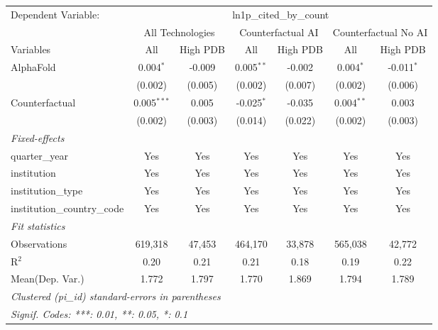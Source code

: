 \begingroup
\centering
\begin{tabular}{lcccccc}
   \tabularnewline \midrule \midrule
   Dependent Variable: & \multicolumn{6}{c}{ln1p\_cited\_by\_count}\\
 & \multicolumn{2}{c}{All Technologies} & \multicolumn{2}{c}{Counterfactual AI} & \multicolumn{2}{c}{Counterfactual No AI} \\
\cmidrule(lr){1-1}\cmidrule(lr){2-3} \cmidrule(lr){4-5} \cmidrule(lr){6-7}
Variables & \multicolumn{1}{c}{All} & \multicolumn{1}{c}{High PDB} & \multicolumn{1}{c}{All} & \multicolumn{1}{c}{High PDB} & \multicolumn{1}{c}{All} & \multicolumn{1}{c}{High PDB} \\
\cmidrule(lr){1-1}\cmidrule(lr){2-2} \cmidrule(lr){3-3} \cmidrule(lr){4-4} \cmidrule(lr){5-5} \cmidrule(lr){6-6} \cmidrule(lr){7-7}
   AlphaFold                    & 0.004$^{*}$   & -0.009  & 0.005$^{**}$ & -0.002  & 0.004$^{*}$  & -0.011$^{*}$\\   
                                & (0.002)       & (0.005) & (0.002)      & (0.007) & (0.002)      & (0.006)\\   
   Counterfactual               & 0.005$^{***}$ & 0.005   & -0.025$^{*}$ & -0.035  & 0.004$^{**}$ & 0.003\\   
                                & (0.002)       & (0.003) & (0.014)      & (0.022) & (0.002)      & (0.003)\\   
   \midrule
   \emph{Fixed-effects}\\
   quarter\_year                & Yes           & Yes     & Yes          & Yes     & Yes          & Yes\\  
   institution                  & Yes           & Yes     & Yes          & Yes     & Yes          & Yes\\  
   institution\_type            & Yes           & Yes     & Yes          & Yes     & Yes          & Yes\\  
   institution\_country\_code   & Yes           & Yes     & Yes          & Yes     & Yes          & Yes\\  
   \midrule
   \emph{Fit statistics}\\
   Observations                 & 619,318       & 47,453  & 464,170      & 33,878  & 565,038      & 42,772\\  
   R$^2$                        & 0.20          & 0.21    & 0.21         & 0.18    & 0.19         & 0.22\\  
Mean(Dep. Var.) & 1.772 & 1.797 & 1.770 & 1.869 & 1.794 & 1.789 \\
   \midrule \midrule
   \multicolumn{7}{l}{\emph{Clustered (pi\_id) standard-errors in parentheses}}\\
   \multicolumn{7}{l}{\emph{Signif. Codes: ***: 0.01, **: 0.05, *: 0.1}}\\
\end{tabular}
\par\endgroup
